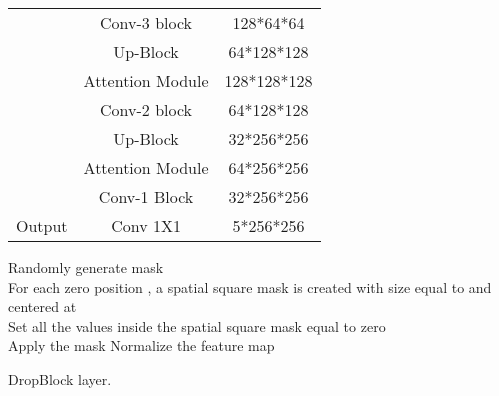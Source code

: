 \documentclass[journal]{IEEEtran}
\begin{document}
\begin{table}[t]
{\begin{tabular}{@{}l|c|c@{}}
                                               & Conv-3 block           & 128*64*64   \\
                                               & Up-Block               & 64*128*128  \\
                                               & Attention Module       & 128*128*128 \\
                                               & Conv-2 block           & 64*128*128  \\
                                               & Up-Block               & 32*256*256  \\
                                               & Attention Module       & 64*256*256  \\
                                               & Conv-1 Block           & 32*256*256  \\ \midrule
Output                                         & Conv 1X1               & 5*256*256   \\ \bottomrule
\end{tabular}}
\end{table}

\begin{algorithm}
\SetAlgoLined
{}

Randomly generate mask \\
For each zero position , a spatial square mask is created with size equal to  and centered at \\
Set all the values inside the spatial square mask equal to zero\\
Apply the mask 
Normalize the feature map 
\caption{DropBlock layer.}
\end{algorithm}
\end{document}
